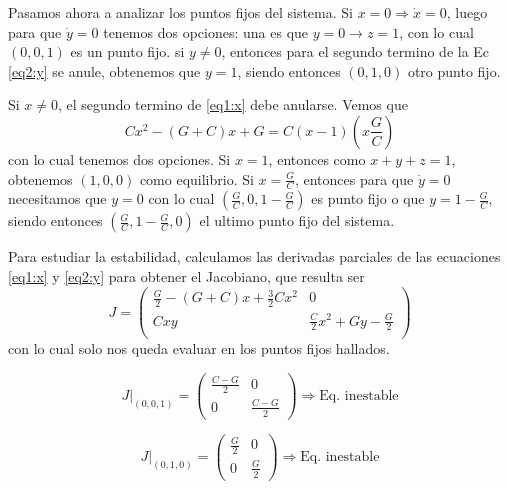 Pasamos ahora a analizar los puntos fijos del sistema. Si $x=0\Rightarrow \dot{x}=0$, luego para que $\dot{y} = 0$ tenemos dos opciones: una es que $y=0\rightarrow z = 1$, con lo cual $\left(0,0,1\right)$ es un punto fijo. si $y\neq 0$, entonces para el segundo termino de la Ec \ref{eq2:y} se anule, obtenemos que $y=1$, siendo entonces $\left(0,1,0\right)$ otro punto fijo.

Si $x\neq 0 $, el segundo termino de \ref{eq1:x} debe anularse. Vemos que
\begin{equation}
    Cx^2  - \left(G+C\right)x +G = C \left(x-1\right) \left(x \dfrac{G}{C}\right)
\end{equation}
con lo cual tenemos dos opciones. Si $x=1$, entonces como $x+y+z=1$, obtenemos $\left(1,0,0\right)$ como equilibrio. Si $x = \frac{G}{C}$, entonces para que $\dot{y} = 0$ necesitamos que $y=0$ con lo cual $\left(\frac{G}{C},0,1-\frac{G}{C}\right)$ es punto fijo o que $y = 1- \frac{G}{C}$, siendo entonces $\left(\frac{G}{C},1-\frac{G}{C},0\right)$ el ultimo punto fijo del sistema.

Para estudiar la estabilidad, calculamos las derivadas parciales de las ecuaciones \ref{eq1:x} y \ref{eq2:y} para obtener el Jacobiano, que resulta ser
\begin{equation}
    J =
\begin{pmatrix}
\frac{G}{2} - \left(G+C\right) x + \frac{3}{2}Cx^2  & 0 \\[6pt]
Cxy                                                 &  \frac{C}{2}x^2 + Gy - \frac{G}{2} \\
\end{pmatrix}
\end{equation}
con lo cual solo nos queda evaluar en los puntos fijos hallados.

\begin{equation}
J |_{\left(0,0,1\right)} =
\begin{pmatrix}
    \frac{C-G}{2}  & 0 \\[4pt]
    0       & \frac{C-G}{2}
\end{pmatrix}
\Rightarrow \text{Eq. inestable}
\end{equation}


\begin{equation}
J |_{\left(0,1,0\right)}=
\begin{pmatrix}
    \frac{G}{2}  & 0 \\[4pt]
    0       & \frac{G}{2}
\end{pmatrix}
\Rightarrow \text{Eq. inestable} 
\end{equation}


